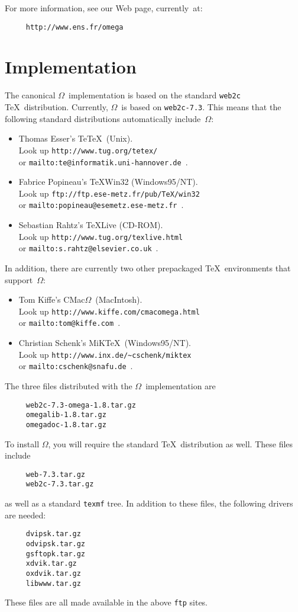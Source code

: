 \documentclass[fleqn]{article}
\newcommand{\OMEGA}{$\Omega$}
\begin{document}
For more information, see our Web page, currently~at:
\begin{verbatim}
     http://www.ens.fr/omega
\end{verbatim}

\section{Implementation}

The canonical \OMEGA\ implementation is based on the standard
\texttt{web2c} \TeX\ distribution.  Currently, \OMEGA\ is based
on \texttt{web2c-7.3}.  This means that the following standard
distributions automatically include~\OMEGA:
\begin{itemize}
\item
Thomas Esser's Te\TeX\ (Unix).\\
Look up \verb|http://www.tug.org/tetex/|\\
or \verb|mailto:te@informatik.uni-hannover.de|~.
\item
Fabrice Popineau's \TeX Win32 (Windows95/NT).\\
Look up \verb|ftp://ftp.ese-metz.fr/pub/TeX/win32|\\
or \verb|mailto:popineau@esemetz.ese-metz.fr|~.
\item
Sebastian Rahtz's \TeX Live (CD-ROM).\\
Look up \verb|http://www.tug.org/texlive.html|\\
or \verb|mailto:s.rahtz@elsevier.co.uk|~.
\end{itemize}

In addition, there are currently two other prepackaged
\TeX\ environments that support~\OMEGA:
\begin{itemize}
\item
Tom Kiffe's CMac\OMEGA\ (MacIntosh).\\
Look up \verb|http://www.kiffe.com/cmacomega.html|\\
or \verb|mailto:tom@kiffe.com|~.
\item
Christian Schenk's MiK\TeX\ (Windows95/NT).\\
Look up \verb|http://www.inx.de/~cschenk/miktex|\\
or \verb|mailto:cschenk@snafu.de|~.
\end{itemize}

The three files distributed with the \OMEGA\ implementation are
\begin{verbatim}
     web2c-7.3-omega-1.8.tar.gz
     omegalib-1.8.tar.gz
     omegadoc-1.8.tar.gz
\end{verbatim}
To install \OMEGA, you will require the standard \TeX\ distribution
as well.  These files include
\begin{verbatim}
     web-7.3.tar.gz
     web2c-7.3.tar.gz
\end{verbatim}
as well as a standard \texttt{texmf} tree.
In addition to these files, the following drivers are needed:
\begin{verbatim}
     dvipsk.tar.gz
     odvipsk.tar.gz
     gsftopk.tar.gz
     xdvik.tar.gz
     oxdvik.tar.gz
     libwww.tar.gz
\end{verbatim}
These files are all made available in the above \texttt{ftp} sites.
\end{document}
